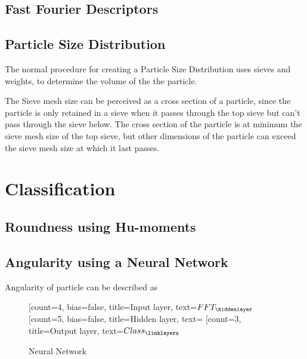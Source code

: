 \documentclass[11pt,fleqn,,a4paper,twoside,openright]{book}
\begin{document}
\subsection{Fast Fourier Descriptors}\label{FFT}

\subsection{Particle Size Distribution}

The normal procedure for creating a Particle Size Distribution uses sieves and weights, to determine the volume of the the particle.

The Sieve mesh size can be perceived as a cross section of a particle, since the particle is only retained in a sieve when it passes through the top sieve but can't pass through the sieve below. The cross section of the particle is at minimum the sieve mesh size of the top sieve, but other dimensions of the particle can exceed the sieve mesh size at which it last passes.

\section{Classification}

\subsection{Roundness using Hu-moments} \label{HuMoments}

\subsection{Angularity using a Neural Network} \label{NeuralNet}
Angularity of particle can be described as 


\begin{figure}[h, center]
	\begin{center}
		\begin{neuralnetwork}[height=4, nodespacing=40]
			\newcommand{\nodetextclear}[2]{}
			\newcommand{\nodetextx}[2]{$FFT_#2$}
			\newcommand{\nodetexty}[2]{$Class_#2$}
			[count=4, bias=false, title=Input layer, text=\nodetextx]
			\hiddenlayer[count=5, bias=false, title=Hidden layer, text=\nodetextclear] \linklayers
			\outputlayer[count=3, title=Output layer, text=\nodetexty] \linklayers
		\end{neuralnetwork}
	\end{center}
	\caption{Neural Network}
\end{figure}
\end{document}
